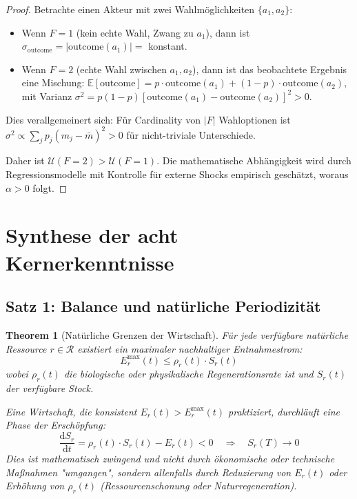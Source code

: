\documentclass[a4paper, 12pt, twoside, openright]{report}
\newtheorem{theorem}{Theorem}[section]
\theoremstyle{definition}
\theoremstyle{definition}
\begin{document}
\begin{proof}
Betrachte einen Akteur mit zwei Wahlmöglichkeiten $\{a_1, a_2\}$:
\begin{itemize}
\item Wenn $F = 1$ (kein echte Wahl, Zwang zu $a_1$), dann ist $\sigma_{\text{outcome}} = |\text{outcome}(a_1)| = $ konstant.
\item Wenn $F = 2$ (echte Wahl zwischen $a_1, a_2$), dann ist das beobachtete Ergebnis eine Mischung: $\mathbb{E}[\text{outcome}] = p \cdot \text{outcome}(a_1) + (1-p) \cdot \text{outcome}(a_2)$, mit Varianz $\sigma^2 = p(1-p)[\text{outcome}(a_1) - \text{outcome}(a_2)]^2 > 0$.
\end{itemize}

Dies verallgemeinert sich: Für Cardinality von $|F|$ Wahloptionen ist $\sigma^2 \propto \sum_j p_j(m_j - \bar{m})^2 > 0$ für nicht-triviale Unterschiede.

Daher ist $\mathcal{U}(F=2) > \mathcal{U}(F=1)$. Die mathematische Abhängigkeit wird durch Regressionsmodelle mit Kontrolle für externe Shocks empirisch geschätzt, woraus $\alpha > 0$ folgt.
\end{proof}

\section{Synthese der acht Kernerkenntnisse}

\subsection{Satz 1: Balance und natürliche Periodizität}

\begin{theorem}[Natürliche Grenzen der Wirtschaft]
\label{thm:balance-periodizitaet}
Für jede verfügbare natürliche Ressource $r \in \mathcal{R}$ existiert ein maximaler nachhaltiger Entnahmestrom:
\begin{equation}
E_r^{\max}(t) \leq \rho_r(t) \cdot S_r(t)
\end{equation}
wobei $\rho_r(t)$ die biologische oder physikalische Regenerationsrate ist und $S_r(t)$ der verfügbare Stock.

Eine Wirtschaft, die konsistent $E_r(t) > E_r^{\max}(t)$ praktiziert, durchläuft eine Phase der Erschöpfung:
\begin{equation}
\frac{\mathrm{d}S_r}{\mathrm{d}t} = \rho_r(t) \cdot S_r(t) - E_r(t) < 0 \quad \Rightarrow \quad S_r(T) \to 0
\end{equation}
Dies ist mathematisch zwingend und nicht durch ökonomische oder technische Maßnahmen "umgangen", sondern allenfalls durch Reduzierung von $E_r(t)$ oder Erhöhung von $\rho_r(t)$ (Ressourcenschonung oder Naturregeneration).
\end{theorem}
\end{document}
